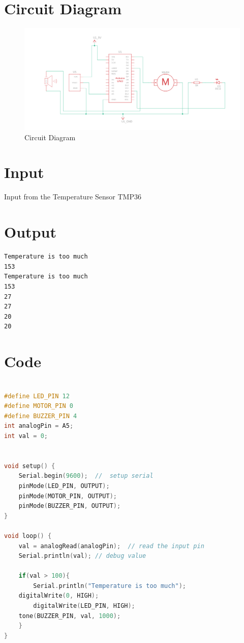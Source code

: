 \documentclass[11pt]{article}
\begin{document}
\section{Circuit Diagram}

\begin{figure}[H]
	\centering
	\includegraphics[width=.95\textwidth]{Screenshot_on_2023-05-02_at_00-10-00.png}
	\caption{Circuit Diagram}
\end{figure}

\section{Input}
Input from the Temperature Sensor TMP36
\section{Output}
\begin{verbatim}
Temperature is too much
153
Temperature is too much
153
27
27
20
20
\end{verbatim}
\section{Code}
\begin{lstlisting}[language=C++]

#define LED_PIN 12
#define MOTOR_PIN 0
#define BUZZER_PIN 4
int analogPin = A5; 
int val = 0; 


void setup() {
	Serial.begin(9600);  //  setup serial
	pinMode(LED_PIN, OUTPUT);
	pinMode(MOTOR_PIN, OUTPUT);
	pinMode(BUZZER_PIN, OUTPUT);
}

void loop() {
	val = analogRead(analogPin);  // read the input pin
	Serial.println(val); // debug value
	
	if(val > 100){
		Serial.println("Temperature is too much");
	digitalWrite(0, HIGH);
		digitalWrite(LED_PIN, HIGH);
	tone(BUZZER_PIN, val, 1000);
	}
}
\end{lstlisting}
\end{document}
